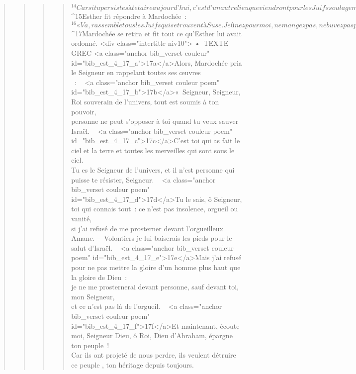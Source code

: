 \begin{verse}
\begin{verse}
\begin{verse}
\begin{verse}
${}^{14}Car si tu persistes à te taire aujourd’hui, c’est d’un autre lieu que viendront pour les Juifs soulagement et délivrance, et toi et la maison de ton père, vous périrez. Qui sait si ce n’est pas en vue d’une circonstance comme celle-ci que tu as accédé à la royauté ? » 
${}^{15}Esther fit répondre à Mardochée : 
${}^{16}« Va, rassemble tous les Juifs qui se trouvent à Suse. Jeûnez pour moi, ne mangez pas, ne buvez pas pendant trois jours, nuit et jour. Moi, je jeûnerai aussi avec mes servantes. C’est alors que j’irai chez le roi, en dépit de la loi, et s’il faut périr, je périrai. » 
${}^{17}Mardochée se retira et fit tout ce qu’Esther lui avait ordonné.
      <div class="intertitle niv10">
        • TEXTE GREC
      <a class="anchor bib_verset couleur" id="bib_est_4_17_a">17a</a>Alors, Mardochée pria le Seigneur en rappelant toutes ses œuvres\\ :
       
        <a class="anchor bib_verset couleur poem" id="bib_est_4_17_b">17b</a>« Seigneur, Seigneur, Roi souverain de l’univers,
        tout est soumis à ton pouvoir,
        \\personne ne peut s’opposer à toi
        quand tu veux sauver Israël.
         
        <a class="anchor bib_verset couleur poem" id="bib_est_4_17_c">17c</a>C’est toi qui as fait le ciel et la terre
        et toutes les merveilles qui sont sous le ciel.
        \\Tu es le Seigneur de l’univers,
        et il n’est personne qui puisse te résister, Seigneur.
         
        <a class="anchor bib_verset couleur poem" id="bib_est_4_17_d">17d</a>Tu le sais, ô Seigneur, toi qui connais tout :
        ce n’est pas insolence, orgueil ou vanité,
        \\si j’ai refusé de me prosterner devant l’orgueilleux Amane.
        – Volontiers je lui baiserais les pieds pour le salut d’Israël.
         
        <a class="anchor bib_verset couleur poem" id="bib_est_4_17_e">17e</a>Mais j’ai refusé pour ne pas mettre la gloire d’un homme
        plus haut que la gloire de Dieu :
        \\je ne me prosternerai devant personne,
        sauf devant toi, mon Seigneur,
        \\et ce n’est pas là de l’orgueil.
         
        <a class="anchor bib_verset couleur poem" id="bib_est_4_17_f">17f</a>Et maintenant, écoute-moi, Seigneur Dieu,
        ô Roi, Dieu d’Abraham,
        épargne ton peuple !
        \\Car ils ont projeté de nous perdre,
        ils veulent détruire ce peuple  , ton héritage depuis toujours.

\end{verse}
\end{verse}
\end{verse}
\end{verse}
